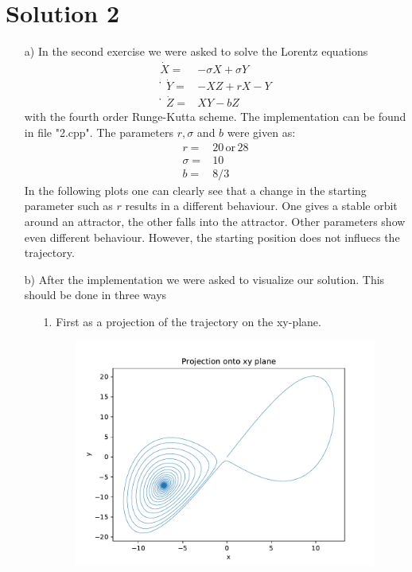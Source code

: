 \section{Solution 2}
\label{sec:auswertung}
    \begin{itemize}
        \item[a)]
            In the second exercise we were asked to solve the Lorentz equations 
            \begin{align*}
                \dot{X} = & -\sigma X + \sigma Y \\
     ̇           \dot{Y} = & -XZ + rX - Y \\
     ̇           \dot{Z} = & XY - bZ
            \end{align*}
            with the fourth order Runge-Kutta scheme.
            The implementation can be found in file "2.cpp".
            The parameters $r, \sigma$ and $b$ were given as:
            \begin{align*}
                r = & 20 \,\text{or}\, 28\\
                \sigma = & 10 \\
                b = & 8/3
            \end{align*}
            In the following plots one can clearly see that a change in the starting parameter such as $r$ results in a different behaviour.
            One gives a stable orbit around an attractor, the other falls into the attractor.
            Other parameters show even different behaviour.
            However, the starting position does not influecs the trajectory.
        \item[b)]
            After the implementation we were asked to visualize our solution.
            This should be done in three ways
            \begin{itemize}
                \item[1.]
                    First as a projection of the trajectory on the xy-plane.
                    \FloatBarrier
                    \begin{figure}
                        \includegraphics[width=\textwidth]{images/Lorentz_r_20_projection.pdf}

\end{figure}
\end{itemize}
\end{itemize}
